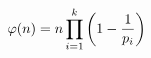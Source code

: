 \documentclass[preview]{standalone}
\begin{document}
\begin{align*}
\special{dvisvgm:raw <g id='unique000'>}\varphi(n)=n\prod_{i=1}^{k}\left(1-\frac{1}{p_i}\right)\special{dvisvgm:raw </g>}
\end{align*}
\end{document}
